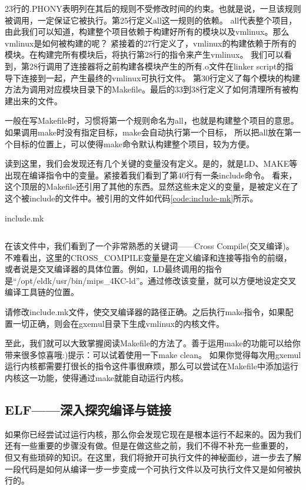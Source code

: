 23行的.PHONY表明列在其后的规则不受修改时间的约束。也就是说，一旦该规则被调用，一定保证它被执行。第25行定义all这一规则的依赖。
all代表整个项目，由此我们可以知道，构建整个项目依赖于构建好所有的模块以及vmlinux。那么vmlinux是如何被构建的呢？
紧接着的27行定义了，vmlinux的构建依赖于所有的模块。在构建完所有模块后，将执行第28行的指令来产生vmlinux。
我们可以看到，第28行调用了连接器将之前构建各模块产生的所有.o文件在linker script的指导下连接到一起，产生最终的vmlinux可执行文件。
第30行定义了每个模块的构建方法为调用对应模块目录下的Makefile。最后的33到38行定义了如何清理所有被构建出来的文件。

\begin{note}
一般在写Makefile时，习惯将第一个规则命名为all，也就是构建整个项目的意思。如果调用make时没有指定目标，make会自动执行第一个目标，
所以把all放在第一个目标的位置上，可以使得make命令默认构建整个项目，较为方便。
\end{note}

读到这里，我们会发现还有几个关键的变量没有定义。是的，就是LD、MAKE等出现在编译指令中的变量。紧接着我们看到了第40行有一条include命令。
看来，这个顶层的Makefile还引用了其他的东西。显然这些未定义的变量，是被定义在了这个被include的文件中。被引用的文件如代码\ref{code:include-mk}所示。

\begin{codeBoxWithCaption}{include.mk\label{code:include-mk}}
  \inputminted[linenos]{make}{codes/include.mk}
\end{codeBoxWithCaption}

在该文件中，我们看到了一个非常熟悉的关键词——Cross Compile(交叉编译)。不难看出，这里的CROSS\_COMPILE变量是在定义编译和连接等指令的前缀，
或者说是交叉编译器的具体位置。例如，LD最终调用的指令是“/opt/eldk/usr/bin/mips\_4KC-ld”。通过修改该变量，就可以方便地设定交叉编译工具链的位置。

\begin{exercise}
请修改include.mk文件，使交叉编译器的路径正确。之后执行make指令，如果配置一切正确，则会在gxemul目录下生成vmlinux的内核文件。
\end{exercise}

至此，我们就可以大致掌握阅读Makefile的方法了。善于运用make的功能可以给你带来很多惊喜哦:)提示：可以试着使用一下make clean。
如果你觉得每次用gxemul运行内核都需要打很长的指令这件事很麻烦，那么可以尝试在Makefile中添加运行内核这一功能，使得通过make就能自动运行内核。

\subsection{ELF——深入探究编译与链接}
如果你已经尝试过运行内核，那么你会发现它现在是根本运行不起来的。因为我们还有一些重要的步骤没有做。但是在做这些之前，我们不得不补充一些重要的，
但又有些琐碎的知识。在这里，我们将掀开可执行文件的神秘面纱，进一步去了解一段代码是如何从编译一步一步变成一个可执行文件以及可执行文件又是如何被执行的。

